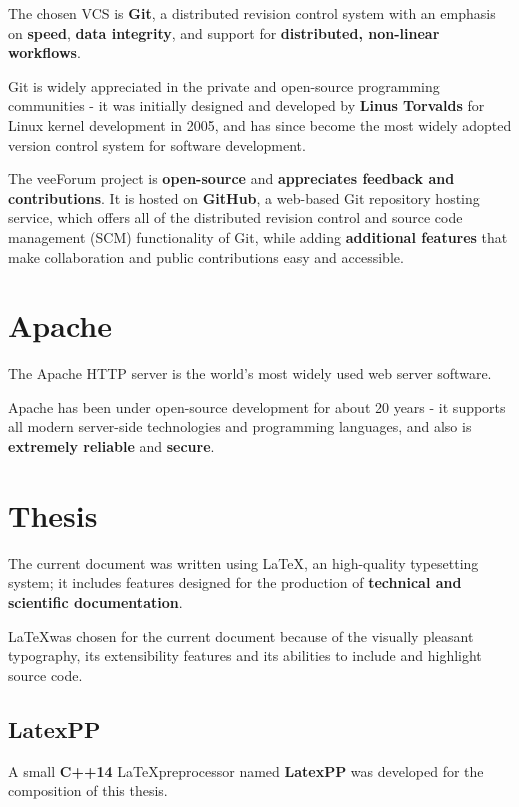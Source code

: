 \documentclass[12pt]{report}
\renewcommand\emph{\textbf}
\begin{document}
                The chosen VCS is \emph{Git}, a distributed revision control system with an emphasis on \emph{speed}, \emph{data integrity}, and support for \emph{distributed, non-linear workflows}.

                Git is widely appreciated in the private and open-source programming communities - it was initially designed and developed by \emph{Linus Torvalds} for Linux kernel development in 2005, and has since become the most widely adopted version control system for software development.

                The veeForum project is \emph{open-source} and \emph{appreciates feedback and contributions}. It is hosted on \emph{GitHub}, a web-based Git repository hosting service, which offers all of the distributed revision control and source code management (SCM) functionality of Git, while adding \emph{additional features} that make collaboration and public contributions easy and accessible.

            \section{Apache}
                The Apache HTTP server is the world's most widely used web server software. 

                Apache has been under open-source development for about 20 years - it supports all modern server-side technologies and programming languages, and also is \emph{extremely reliable} and \emph{secure}.
                        
            \section{Thesis}
                The current document was written using \LaTeX, an high-quality typesetting system; it includes features designed for the production of \emph{technical and scientific documentation}.

                \LaTeX was chosen for the current document because of the visually pleasant typography, its extensibility features and its abilities to include and highlight source code.

                \subsection{LatexPP}
                    A small \emph{C++14} \LaTeX preprocessor named \emph{LatexPP} was developed for the composition of this thesis.
\end{document}
